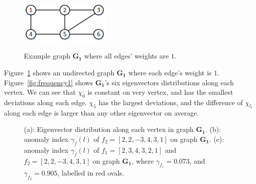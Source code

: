 \begin{figure}[t]
	\centering
    {
		\includegraphics[height=0.8in] {figures/graph_G.png}
	}
    \vspace{-2mm}
	\caption{Example graph $\mathbf{G_1}$ where all edges' weights are $1$.}
	\label{fig:graph_G}
\end{figure}


Figure~\ref{fig:graph_G} shows an undirected graph $\mathbf{G_1}$ where each edge's weight is $1$. Figure~\ref{fig:frequency1} shows  $\mathbf{G_1}$'s six eigenvectors distributions along each vertex. We can see that
$\chi_0$ is constant on very vertex, and has the smallest deviations along each edge. $\chi_5$ has the largest deviations, and the difference of $\chi_5$ along each edge is larger than any other eigenvector on average.




\begin{figure}[ht]
	\centering
    \vspace{-5mm}
    \vspace{-3mm}
    \vspace{-2mm}

	\caption{(a): Eigenvector distribution along each vertex in graph $\mathbf{G_1}$.  (b): anomaly index $\gamma_f(l)$ of $f_2=[2,2,-3,4,3,1]$ on graph $\mathbf{G_1}$. (c): anomaly index $\gamma_f(l)$ of $f_1=[2,3,4,3,2,1]$  and $f_2=[2,2,-3,4,3,1]$ on graph $\mathbf{G_1}$, where $\gamma_{f_1}=0.073$, and $\gamma_{f_2}=0.905$, labelled in red ovals.}
	\label{fig:f_on_g2}
\end{figure}

